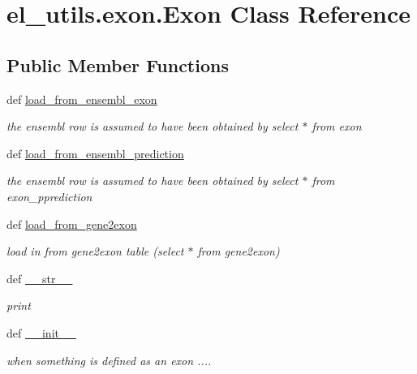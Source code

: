\hypertarget{classel__utils_1_1exon_1_1Exon}{\section{el\-\_\-utils.\-exon.\-Exon Class Reference}
\label{classel__utils_1_1exon_1_1Exon}
}
\subsection*{Public Member Functions}
\begin{DoxyCompactItemize}
\item 
def \hyperlink{classel__utils_1_1exon_1_1Exon_aa1f4212d7a3dcbcb6f4d3358ae3fbeec}{load\-\_\-from\-\_\-ensembl\-\_\-exon}
\begin{DoxyCompactList}\small\item\em the ensembl row is assumed to have been obtained by select $\ast$ from exon \end{DoxyCompactList}\item 
def \hyperlink{classel__utils_1_1exon_1_1Exon_a0b2caf9ef1d0c1ec460fb8d9eca9cd47}{load\-\_\-from\-\_\-ensembl\-\_\-prediction}
\begin{DoxyCompactList}\small\item\em the ensembl row is assumed to have been obtained by select $\ast$ from exon\-\_\-pprediction \end{DoxyCompactList}\item 
def \hyperlink{classel__utils_1_1exon_1_1Exon_ad1f1a7f1d6ef48850f55822a28de1e6a}{load\-\_\-from\-\_\-gene2exon}
\begin{DoxyCompactList}\small\item\em load in from gene2exon table (select $\ast$ from gene2exon) \end{DoxyCompactList}\item 
def \hyperlink{classel__utils_1_1exon_1_1Exon_a0999e52cbfbae5f707279d60bb696478}{\-\_\-\-\_\-str\-\_\-\-\_\-}
\begin{DoxyCompactList}\small\item\em print \end{DoxyCompactList}\item 
def \hyperlink{classel__utils_1_1exon_1_1Exon_a073bfacce1b1f5481d96c099943e5064}{\-\_\-\-\_\-init\-\_\-\-\_\-}
\begin{DoxyCompactList}\small\item\em when something is defined as an exon .... \end{DoxyCompactList}\end{DoxyCompactItemize}
